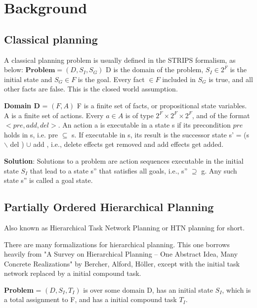 \chapter{Background}\label{chap:background}

\section{Classical planning}
A classical planning problem is usually defined in the STRIPS formalism, as below:
$\textbf{Problem} = (D, S_I, S_G)$ \newline
D is the domain of the problem, \newline
$S_I \in 2^F$ is the initial state and $S_G \in F$ is the goal. \newline
Every fact $\in F$ included in $S_G$ is true, and all other facts are false. This is the closed world assumption.


\textbf{Domain D} = $(F, A)$ \newline
F is a finite set of facts, or propositional state variables. \newline
A is a finite set of actions. \newline Every $a \in A$ is of type $2^F \times 2^F \times 2^F$, and of the format $<pre, add, del>$.
An action a is executable in a state s if its precondition $pre$ holds in s, i.e. pre $\subseteq$ s. \newline
If executable in s, its result is the successor state s' = (s $\backslash$ del ) $\cup$ add , i.e., delete effects get removed and add
effects get added.

\textbf{Solution}: Solutions to a problem are action sequences executable in the initial state $S_I$ that lead to a state s'' that satisfies all
goals, i.e., s'' $ \supseteq$ g. Any such state s'' is called a goal state.

\newpage
\section{Partially Ordered Hierarchical Planning}
Also known as Hierarchical Task Network Planning or HTN planning for short.

There are many formalizations for hierarchical planning. This one borrows heavily from "A Survey on Hierarchical Planning – One Abstract Idea, Many Concrete Realizations" by Bercher, Alford, H\"{o}ller, except with the initial task network replaced by a initial compound task. 

\textbf{Problem} = $(D, S_I, T_I)$
is over some domain D, 
has an initial state $S_I$, which is a total assignment to F, and 
has a initial compound task $T_I$. 

